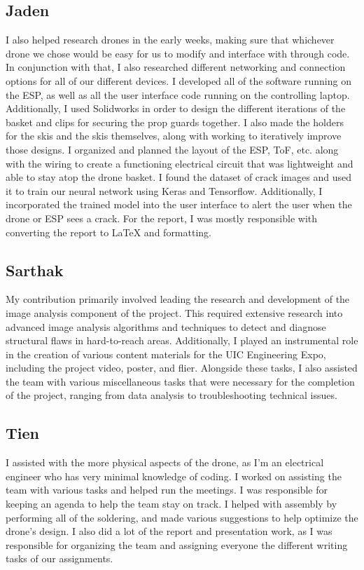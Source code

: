 \documentclass[12pt]{article}
\begin{document}
        \subsection*{Jaden}
            I also helped research drones in the early weeks, making sure that whichever drone we chose would be easy for us to modify and interface with through code.
            In conjunction with that, I also researched different networking and connection options for all of our different devices.
            I developed all of the software running on the ESP, as well as all the user interface code running on the controlling laptop.
            Additionally, I used Solidworks in order to design the different iterations of the basket and clips for securing the prop guards together.
            I also made the holders for the skis and the skis themselves, along with working to iteratively improve those designs.
            I organized and planned the layout of the ESP, ToF, etc. along with the wiring to create a functioning electrical circuit that was lightweight and able to stay atop the drone basket.
            I found the dataset of crack images and used it to train our neural network using Keras and Tensorflow.
            Additionally, I incorporated the trained model into the user interface to alert the user when the drone or ESP sees a crack.
            For the report, I was mostly responsible with converting the report to LaTeX and formatting.

        \subsection*{Sarthak}
            My contribution primarily involved leading the research and development of the image analysis component of the project.
            This required extensive research into advanced image analysis algorithms and techniques to detect and diagnose structural flaws in hard-to-reach areas.
            Additionally, I played an instrumental role in the creation of various content materials for the UIC Engineering Expo, including the project video, poster, and flier.
            Alongside these tasks, I also assisted the team with various miscellaneous tasks that were necessary for the completion of the project, ranging from data analysis to troubleshooting technical issues.
        \subsection*{Tien}
            I assisted with the more physical aspects of the drone, as I'm an electrical engineer who has very minimal knowledge of coding.
            I worked on assisting the team with various tasks and helped run the meetings.
            I was responsible for keeping an agenda to help the team stay on track.
            I helped with assembly by performing all of the soldering, and made various suggestions to help optimize the drone's design.
            I also did a lot of the report and presentation work, as I was responsible for organizing the team and assigning everyone the different writing tasks of our assignments.
\end{document}
